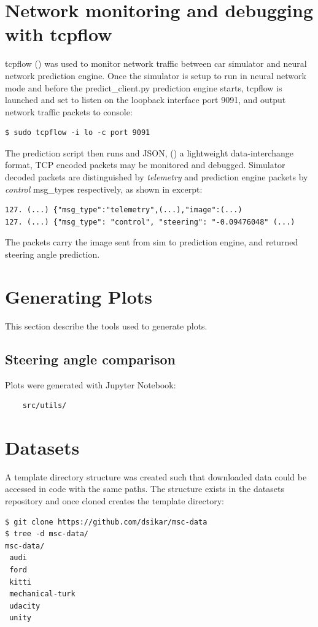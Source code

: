 \section{Network monitoring and debugging with tcpflow}
\label{NetMonDebug}
tcpflow (\cite{garfinkel2013passive}) was used to monitor network traffic between car simulator and neural network prediction engine. Once the simulator is setup to run in neural network mode and before the predict\_client.py prediction engine starts, tcpflow is launched and set to listen on the loopback interface port 9091, and output network traffic packets to console:
\begin{verbatim}
$ sudo tcpflow -i lo -c port 9091
\end{verbatim}
The prediction script then runs and JSON, (\cite{pezoa2016foundations}) a lightweight data-interchange format, TCP encoded packets may be monitored and debugged. Simulator decoded packets are distinguished by \textit{telemetry} and prediction engine packets by \textit{control} msg\_types respectively, as shown in excerpt:
\begin{verbatim}
127. (...) {"msg_type":"telemetry",(...),"image":(...)
127. (...) {"msg_type": "control", "steering": "-0.09476048" (...)
\end{verbatim}
The packets carry the image sent from sim to prediction engine, and returned steering angle prediction.

\section{Generating Plots}

This section describe the tools used to generate plots.

\subsection{Steering angle comparison}

Plots were generated with Jupyter Notebook:
\begin{verbatim}
    src/utils/
\end{verbatim}

\section{Datasets}

A template directory structure was created such that downloaded data could be accessed in code with the same paths. The structure exists in the datasets repository and once cloned creates the template directory:
\begin{verbatim}
$ git clone https://github.com/dsikar/msc-data
$ tree -d msc-data/
msc-data/
 audi
 ford
 kitti
 mechanical-turk
 udacity
 unity
\end{verbatim}

